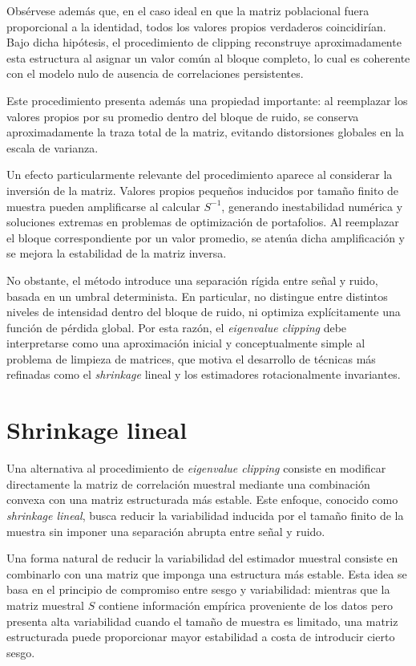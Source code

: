 \documentclass[letterpaper,12pt,oneside]{book}
\begin{document}
Obsérvese además que, en el caso ideal en que la matriz poblacional fuera proporcional a la identidad, todos los valores propios verdaderos coincidirían. Bajo dicha hipótesis, el procedimiento de clipping reconstruye aproximadamente esta estructura al asignar un valor común al bloque completo, lo cual es coherente con el modelo nulo de ausencia de correlaciones persistentes.

Este procedimiento presenta además una propiedad importante: al reemplazar los valores propios por su promedio dentro del bloque de ruido, se conserva aproximadamente la traza total de la matriz, evitando distorsiones globales en la escala de varianza.

Un efecto particularmente relevante del procedimiento aparece al considerar la inversión de la matriz. Valores propios pequeños inducidos por tamaño finito de muestra pueden amplificarse al calcular $S^{-1}$, generando inestabilidad numérica y soluciones extremas en problemas de optimización de portafolios. Al reemplazar el bloque correspondiente por un valor promedio, se atenúa dicha amplificación y se mejora la estabilidad de la matriz inversa.

No obstante, el método introduce una separación rígida entre señal y ruido, basada en un umbral determinista. En particular, no distingue entre distintos niveles de intensidad dentro del bloque de ruido, ni optimiza explícitamente una función de pérdida global. Por esta razón, el \textit{eigenvalue clipping} debe interpretarse como una aproximación inicial y conceptualmente simple al problema de limpieza de matrices, que motiva el desarrollo de técnicas más refinadas como el \textit{shrinkage} lineal y los estimadores rotacionalmente invariantes.

\section{Shrinkage lineal}

Una alternativa al procedimiento de \textit{eigenvalue clipping} consiste en modificar directamente la matriz de correlación muestral mediante una combinación convexa con una matriz estructurada más estable. Este enfoque, conocido como \textit{shrinkage lineal}, busca reducir la variabilidad inducida por el tamaño finito de la muestra sin imponer una separación abrupta entre señal y ruido.

Una forma natural de reducir la variabilidad del estimador muestral consiste en combinarlo con una matriz que imponga una estructura más estable. Esta idea se basa en el principio de compromiso entre sesgo y variabilidad: mientras que la matriz muestral $S$ contiene información empírica proveniente de los datos pero presenta alta variabilidad cuando el tamaño de muestra es limitado, una matriz estructurada puede proporcionar mayor estabilidad a costa de introducir cierto sesgo.
\end{document}
